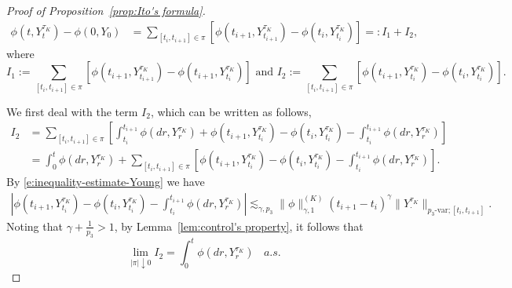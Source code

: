 \documentclass[11pt,reqno]{amsart}
\numberwithin{equation}{section}
\begin{document}
\begin{proof}[Proof of Proposition~\ref{prop:Ito's formula}]
\begin{equation}\label{decomI}	
\begin{aligned}
\phi(t,Y^{\tau_{K}}_{t}) - \phi(0,Y_{0}) &= \sum_{[t_{i},t_{i+1}]\in \pi}\left[\phi(t_{i+1},Y^{\tau_{K}}_{t_{i+1}}) - \phi(t_{i},Y^{\tau_{K}}_{t_{i}})\right]  =: I_{1} + I_{2},
\end{aligned} 
\end{equation}
where \[I_{1} := \sum_{[t_{i},t_{i+1}]\in\pi}\left[\phi(t_{i+1},Y^{\tau_{K}}_{t_{i+1}}) - \phi(t_{i+1},Y^{\tau_{K}}_{t_{i}})\right]  \text{ and } I_{2} := \sum_{[t_{i},t_{i+1}]\in\pi}\left[\phi(t_{i+1},Y^{\tau_{K}}_{t_{i}}) - \phi(t_{i},Y^{\tau_{K}}_{t_{i}})\right]
.\]

We first deal with the term $I_{2}$, which can be written as	follows,	
\begin{equation*}
\begin{aligned}
I_{2} & = \sum_{[t_{i},t_{i+1}]\in\pi} \left[\int_{t_{i}}^{t_{i+1}}\phi(dr,Y^{\tau_{K}}_{r}) + \phi(t_{i+1},Y^{\tau_{K}}_{t_{i}}) - \phi(t_{i},Y^{\tau_{K}}_{t_{i}}) - \int_{t_{i}}^{t_{i+1}}\phi(dr,Y^{\tau_{K}}_{r})\right]\\
& = \int_{0}^{t}\phi(dr,Y^{\tau_{K}}_{r}) +\sum_{[t_{i},t_{i+1}]\in\pi}\left[ \phi(t_{i+1},Y^{\tau_{K}}_{t_{i}}) - \phi(t_{i},Y^{\tau_{K}}_{t_{i}}) - \int_{t_{i}}^{t_{i+1}}\phi(dr,Y^{\tau_{K}}_{r})\right].
\end{aligned}
\end{equation*}
By \eqref{e:inequality-estimate-Young} we have 	
\begin{align*}	
\left|\phi(t_{i+1},Y^{\tau_{K}}_{t_{i}}) - \phi(t_{i},Y^{\tau_{K}}_{t_{i}}) - \int_{t_{i}}^{t_{i+1}}\phi(dr,Y^{\tau_{K}}_{r})\right| \lesssim_{\gamma,p_{3}} \|\phi\|^{(K)}_{\gamma,1}(t_{i+1}-t_{i})^{\gamma} \|Y^{\tau_{K}}_{\cdot}\|_{p_{3}\text{-var};[t_{i},t_{i+1}]}.
\end{align*}
Noting that $\gamma + \frac{1}{p_{3}}>1$, by Lemma~\ref{lem:control's property}, it follows that
\begin{equation}\label{e:I2}
\lim_{|\pi|\downarrow 0} I_{2} = \int_{0}^{t}\phi(dr,Y^{\tau_{K}}_{r})\ \ \ \ a.s.	
\end{equation}


\end{proof}
\end{document}
